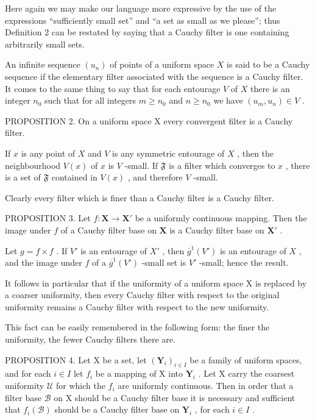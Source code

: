 Here again we may make our language more expressive by the use of the expressions ``sufficiently small set'' and ``a set as small as we please''; thus Definition 2 can be restated by saying that a Cauchy filter is one containing arbitrarily small sets.

An infinite sequence \((u_n)\) of points of a uniform space \(X\) is said to be a Cauchy sequence if the elementary filter associated with the sequence is a Cauchy filter. It comes to the same thing to say that for each entourage \(V\) of \(X\) there is an integer \(n_0\) such that for all integers \(m \geqslant n_0\) and \(n \geqslant n_0\) we have \((u_m, u_n) \in V\) .

PROPOSITION 2. On a uniform space X every convergent filter is a Cauchy filter.

If \(x\) is any point of \(X\) and \(V\) is any symmetric entourage of \(X\) , then the neighbourhood \(V(x)\) of \(x\) is \(V\) -small. If \(\mathfrak{F}\) is a filter which converges to \(x\) , there is a set of \(\mathfrak{F}\) contained in \(V(x)\) , and therefore \(V\) -small.

Clearly every filter which is finer than a Cauchy filter is a Cauchy filter.

PROPOSITION 3. Let \(f: \mathbf{X} \to \mathbf{X}'\) be a uniformly continuous mapping. Then the image under \(f\) of a Cauchy filter base on \(\mathbf{X}\) is a Cauchy filter base on \(\mathbf{X}'\) .

Let \(g = f \times f\) . If \(V'\) is an entourage of \(X'\) , then \(\overline{g}^1(V')\) is an entourage of \(X\) , and the image under \(f\) of a \(\overline{g}^1(V')\) -small set is \(V'\) -small; hence the result.

It follows in particular that if the uniformity of a uniform space X is replaced by a coarser uniformity, then every Cauchy filter with respect to the original uniformity remains a Cauchy filter with respect to the new uniformity.

This fact can be easily remembered in the following form: the finer the uniformity, the fewer Cauchy filters there are.

PROPOSITION 4. Let X be a set, let \((\mathbf{Y}_i)_{i\in I}\) be a family of uniform spaces, and for each \(i\in I\) let \(f_i\) be a mapping of X into \(\mathbf{Y}_i\) . Let X carry the coarsest uniformity \(\mathcal{U}\) for which the \(f_i\) are uniformly continuous. Then in order that a filter base \(\mathcal{B}\) on X should be a Cauchy filter base it is necessary and sufficient that \(f_i(\mathcal{B})\) should be a Cauchy filter base on \(\mathbf{Y}_i\) , for each \(i\in I\) .

